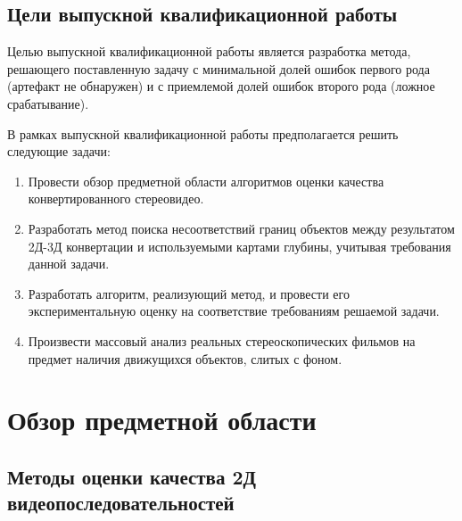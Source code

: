 \documentclass[14pt, a4paper]{extarticle}
\begin{document}
\subsection{Цели выпускной квалификационной работы}

Целью выпускной квалификационной работы является разработка метода, решающего поставленную задачу 
с минимальной долей ошибок первого рода (артефакт не обнаружен) и 
с приемлемой долей ошибок второго рода (ложное срабатывание).

В рамках выпускной квалификационной работы предполагается решить следующие задачи:

\begin{enumerate}
	\item Провести обзор предметной области алгоритмов оценки качества конвертированного стереовидео.
	\item Разработать метод поиска несоответствий границ объектов между результатом 2Д-3Д конвертации 
	и используемыми картами глубины, учитывая требования данной задачи.
	\item Разработать алгоритм, реализующий метод, и провести его экспериментальную оценку 
	на соответствие требованиям решаемой задачи.
	\item Произвести массовый анализ реальных стереоскопических фильмов 
	на предмет наличия движущихся объектов, слитых с фоном.
\end{enumerate}


\newpage
\section{Обзор предметной области}

\subsection{Методы оценки качества 2Д видеопоследовательностей}
\end{document}
